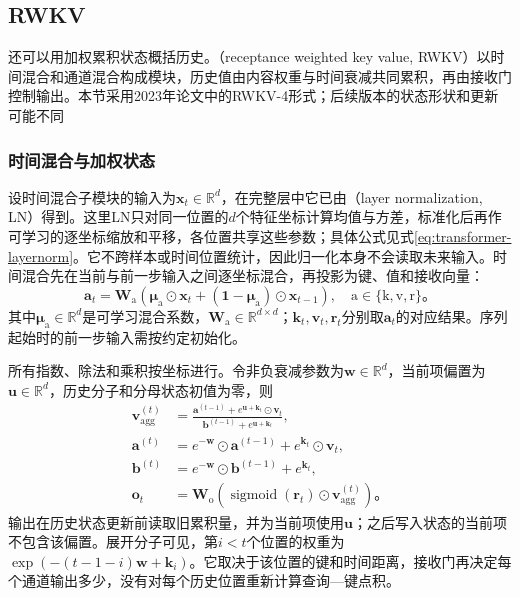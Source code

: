\Needspace{105mm}
\subsection{RWKV}
\label{sec:rnn-rwkv}

还可以用加权累积状态概括历史。（receptance weighted key value, RWKV）以时间混合和通道混合构成模块，历史值由内容权重与时间衰减共同累积，再由接收门控制输出。本节采用2023年论文中的RWKV-4形式；后续版本的状态形状和更新可能不同

\subsubsection{时间混合与加权状态}
\label{sec:rnn-rwkv-time-mixing}

设时间混合子模块的输入为$\bm{x}_t\in\mathbb{R}^{d}$，在完整层中它已由（layer normalization, LN）得到。这里LN只对同一位置的$d$个特征坐标计算均值与方差，标准化后再作可学习的逐坐标缩放和平移，各位置共享这些参数；具体公式见式\eqref{eq:transformer-layernorm}。它不跨样本或时间位置统计，因此归一化本身不会读取未来输入。时间混合先在当前与前一步输入之间逐坐标混合，再投影为键、值和接收向量：
\begin{equation}
  \bm{a}_t=\bm{W}_{\mathrm{a}}\!\left(
    \bm{\mu}_{\mathrm{a}}\odot\bm{x}_t
    +(\bm{1}-\bm{\mu}_{\mathrm{a}})\odot\bm{x}_{t-1}\right),
  \quad \mathrm{a}\in\{\mathrm{k},\mathrm{v},\mathrm{r}\}\text{。}
  \label{eq:rnn-rwkv-time-mixing}
\end{equation}
其中$\bm{\mu}_{\mathrm{a}}\in\mathbb{R}^{d}$是可学习混合系数，$\bm{W}_{\mathrm{a}}\in\mathbb{R}^{d\times d}$；$\bm{k}_t,\bm{v}_t,\bm{r}_t$分别取$\bm{a}_t$的对应结果。序列起始时的前一步输入需按约定初始化。

所有指数、除法和乘积按坐标进行。令非负衰减参数为$\bm{w}\in\mathbb{R}^{d}$，当前项偏置为$\bm{u}\in\mathbb{R}^{d}$，历史分子和分母状态初值为零，则
\begin{equation}
  \begin{aligned}
    \bm{v}_{\mathrm{agg}}^{(t)}&=
      \frac{\bm{a}^{(t-1)}+e^{\bm{u}+\bm{k}_t}\odot\bm{v}_t}
           {\bm{b}^{(t-1)}+e^{\bm{u}+\bm{k}_t}},\\
    \bm{a}^{(t)}&=e^{-\bm{w}}\odot\bm{a}^{(t-1)}
                    +e^{\bm{k}_t}\odot\bm{v}_t,\\
    \bm{b}^{(t)}&=e^{-\bm{w}}\odot\bm{b}^{(t-1)}+e^{\bm{k}_t},\\
    \bm{o}_t&=\bm{W}_{\mathrm{o}}\!\left(
      \operatorname{sigmoid}(\bm{r}_t)\odot\bm{v}_{\mathrm{agg}}^{(t)}\right)\text{。}
  \end{aligned}
  \label{eq:rnn-rwkv-recurrence}
\end{equation}
输出在历史状态更新前读取旧累积量，并为当前项使用$\bm{u}$；之后写入状态的当前项不包含该偏置。展开分子可见，第$i<t$个位置的权重为$\exp(-(t-1-i)\bm{w}+\bm{k}_i)$。它取决于该位置的键和时间距离，接收门再决定每个通道输出多少，没有对每个历史位置重新计算查询—键点积。

